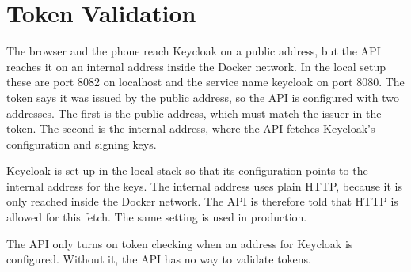 \documentclass[a4paper,11pt]{article}
\begin{document}
\section{Token Validation}
The browser and the phone reach Keycloak on a public address, but the API reaches it on an internal address inside the Docker network. In the local setup these are port 8082 on localhost and the service name keycloak on port 8080. The token says it was issued by the public address, so the API is configured with two addresses. The first is the public address, which must match the issuer in the token. The second is the internal address, where the API fetches Keycloak's configuration and signing keys.

Keycloak is set up in the local stack so that its configuration points to the internal address for the keys. The internal address uses plain HTTP, because it is only reached inside the Docker network. The API is therefore told that HTTP is allowed for this fetch. The same setting is used in production.

The API only turns on token checking when an address for Keycloak is configured. Without it, the API has no way to validate tokens.

\printbibliography
\end{document}
